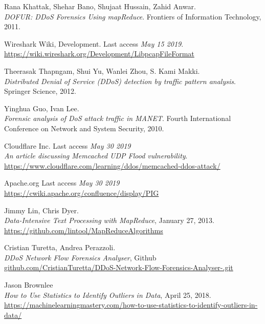 \begin{thebibliography}{9}
Rana Khattak, Shehar Bano, Shujaat Hussain, Zahid Anwar. 
\\\textit{DOFUR: DDoS Forensics Using mapReduce}. Frontiers of Information Technology, 2011.

Wireshark Wiki, Development. Last access \textit{May 15 2019}.
\\\url{https://wiki.wireshark.org/Development/LibpcapFileFormat}

Theerasak Thapngam, Shui Yu, Wanlei Zhou, S. Kami Makki.
\\\textit{Distributed Denial of Service (DDoS) detection by traffic pattern analysis}.
Springer Science, 2012.

Yinghua Guo, Ivan Lee.
\\\textit{Forensic analysis of DoS attack traffic in MANET}. 
Fourth International Conference on Network and System Security, 2010.

Cloudflare Inc. Last access \textit{May 30 2019}
\\\textit{An article discussing Memcached UDP Flood vulnerability}. 
\\\url{https://www.cloudflare.com/learning/ddos/memcached-ddos-attack/}

Apache.org Last access \textit{May 30 2019}
\\\url{https://cwiki.apache.org/confluence/display/PIG}

Jimmy Lin, Chris Dyer.
\\\textit{Data-Intensive Text Processing with MapReduce}, January 27, 2013.
\\\url{https://github.com/lintool/MapReduceAlgorithms}

Cristian Turetta, Andrea Perazzoli.
\\\textit{DDoS Network Flow Forensics Analyser}, Github
\\\href{https://github.com/CristianTuretta/DDoS-Network-Flow-Forensics-Analyser-.git}{github.com/CristianTuretta/DDoS-Network-Flow-Forensics-Analyser-.git}

Jason Brownlee
\\\textit{How to Use Statistics to Identify Outliers in Data}, April 25, 2018.
\\\href{https://machinelearningmastery.com/how-to-use-statistics-to-identify-outliers-in-data/}{https://machinelearningmastery.com/how-to-use-statistics-to-identify-outliers-in-data/}

\end{thebibliography}